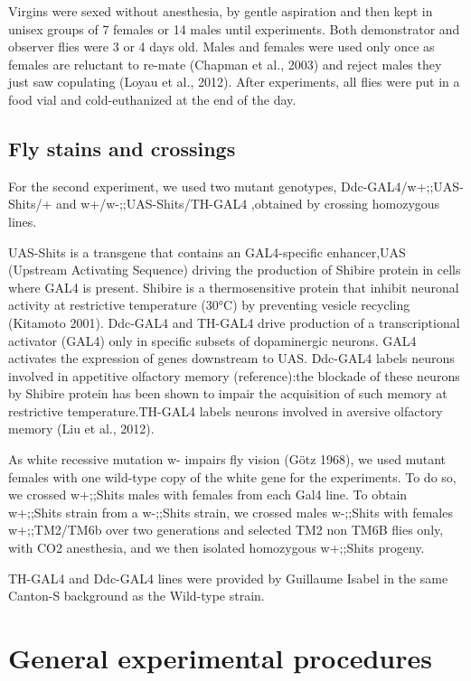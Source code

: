 \documentclass[a4paper, 12pt]{article}
\begin{document}
	Virgins were sexed without anesthesia, by gentle aspiration and then kept in unisex groups of 7 females or 14 males until experiments. Both demonstrator and observer flies were 3 or 4 days old. Males and females were used only once as females are reluctant to re-mate (Chapman et al., 2003) and reject males they just saw copulating (Loyau et al., 2012). After experiments, all flies were put in a food vial and cold-euthanized at the end of the day.
	
	\subsection{Fly stains and crossings}
	
	For the second experiment, we used two mutant genotypes, Ddc-GAL4/w+;;UAS-Shits/+ and w+/w-;;UAS-Shits/TH-GAL4 ,obtained by crossing homozygous lines. 
	
	UAS-Shits is a transgene that contains an GAL4-specific enhancer,UAS (Upstream Activating Sequence) driving the production of Shibire protein in cells where GAL4 is present. Shibire is a thermosensitive protein that inhibit neuronal activity at restrictive temperature (30°C) by preventing vesicle recycling (Kitamoto 2001). Ddc-GAL4 and TH-GAL4 drive production of a transcriptional activator (GAL4) only in specific subsets of dopaminergic neurons. GAL4 activates the expression of genes downstream to UAS. Ddc-GAL4 labels neurons involved in appetitive olfactory memory (reference):the blockade of these neurons by Shibire protein has been shown to impair the acquisition of such memory at restrictive temperature.TH-GAL4 labels neurons involved in aversive olfactory memory (Liu et al., 2012).
	
	As white recessive mutation w- impairs fly vision (Götz 1968), we used mutant females with one wild-type copy of the white gene for the experiments. To do so, we crossed w+;;Shits males with females from each Gal4 line. To obtain w+;;Shits strain from a w-;;Shits strain, we crossed males w-;;Shits with females w+;;TM2/TM6b over two generations and selected TM2 non TM6B flies only, with CO2 anesthesia, and we then isolated homozygous w+;;Shits progeny.
	
	TH-GAL4 and Ddc-GAL4 lines were provided by Guillaume Isabel in the same Canton-S background as the Wild-type strain.
	
	\section{General experimental procedures}
	
\end{document}
